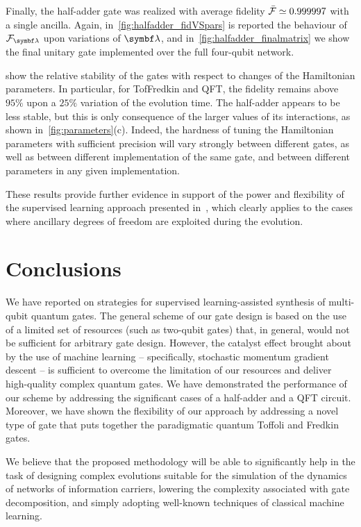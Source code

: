 Finally, the half-adder gate was realized with average fidelity $\bar{{\mathcal{F}}}\simeq0.999997$ with a single ancilla.
Again, in~\cref{fig:halfadder_fidVSpars} is reported the behaviour of $\calF_\bslambda$ upon variations of $\bslambda$, and in~\cref{fig:halfadder_finalmatrix} we show the final unitary gate implemented over the full four-qubit network.

 show the relative stability of the gates with respect to changes of the Hamiltonian parameters.
In particular, for TofFredkin and \ac{QFT}, the fidelity remains above $95\%$ upon a $25\%$ variation of the evolution time.
The half-adder appears to be less stable, but this is only consequence of the larger values of its interactions, as shown in~\cref{fig:parameters}(c).
Indeed, the hardness of tuning the Hamiltonian parameters with sufficient precision will vary strongly between different gates, as well as between different implementation of the same gate, and between different parameters in any given implementation.

These results provide further evidence in support of the power and flexibility of the supervised learning approach presented in~\cite{innocenti2018supervised,banchi2016quantum}, which clearly applies to the cases where ancillary degrees of freedom are exploited during the evolution.


\section{Conclusions}
\label{concl}

We have reported on strategies for supervised learning-assisted synthesis of multi-qubit quantum gates. The general scheme of our gate design is based on the use of a limited set of resources (such as two-qubit gates) that, in general, would not be sufficient for arbitrary gate design. However, the catalyst effect brought about by the use of machine learning -- specifically, stochastic momentum gradient descent -- is sufficient to overcome the limitation of our resources and deliver high-quality complex quantum gates. We have demonstrated the performance of our scheme by addressing the significant cases of a half-adder and a \ac{QFT} circuit. Moreover, we have shown the flexibility of our approach by addressing a novel type of gate that puts together the paradigmatic quantum Toffoli and Fredkin gates.

We believe that the proposed methodology will be able to significantly help in the task of designing complex evolutions suitable for the simulation of the dynamics of networks of information carriers, lowering the complexity associated with gate decomposition, and simply adopting well-known techniques of classical machine learning.
